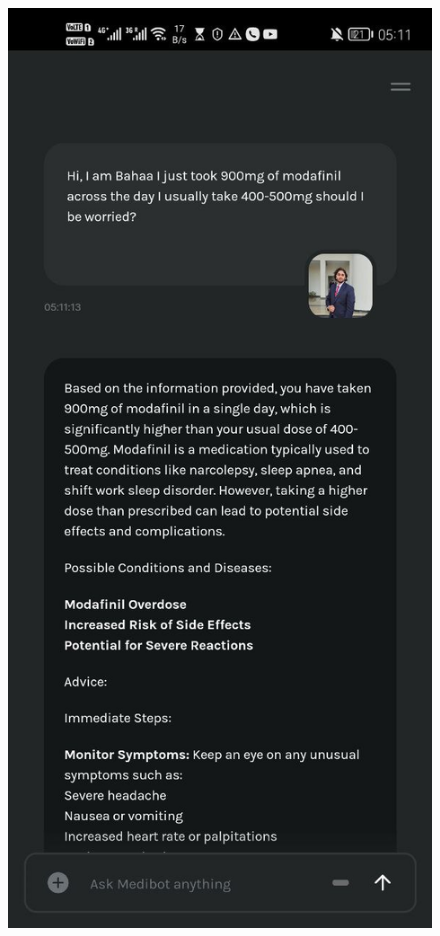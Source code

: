 \begin{figure}[htbp]
    \centering
    \begin{minipage}{0.3\textwidth}
        \centering
        \includegraphics[width=\textwidth]{./Figures/mobile-chat.jpg}

\end{minipage}
\end{figure}
